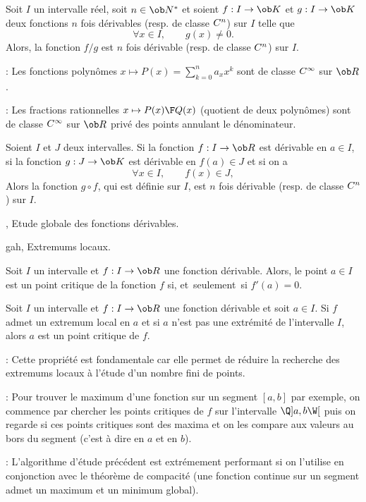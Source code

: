 \Propriete []  Soit $I$ un intervalle r\'eel, soit $n\in\ob N^*$ et soient $f:I\to\ob K$ et $g:I\to\ob K$ 
\pn
deux fonctions $n$ fois d\'erivables (resp. de classe $\sc C^n$) sur $I$ telle que 
$$
\forall x\in I, \qquad g(x)\neq 0.
$$ 
Alors, la fonction $f/g$ est $n$ fois d\'erivable (resp. de classe $\sc C^n$) sur $I$. 

\Remarque : Les fonctions polyn\^omes $x\mapsto P(x)=\sum_{k=0}^n a_xx^k$ sont de classe $\sc C^\infty$ 
sur $\ob R$. 
\bigskip

\Remarque  : Les fractions rationnelles $x\mapsto {P(x)\F Q(x)}$ (quotient de deux polyn\^omes) sont de classe $\sc C^\infty$ sur $\ob R$ priv\'e des points annulant le d\'enominateur. 
\bigskip

 
\Theoreme []  Soient $I$ et $J$ deux intervalles. Si la fonction $f:I\to\ob R$ 
est d\'erivable en $a\in I$, si la fonction $g:J\to\ob K$ est d\'erivable en $f(a)\in J$ et si on a 
$$
\forall x\in I, \qquad f(x)\in J,
$$
Alors la fonction $g\circ f$, qui est d\'efinie sur $I$, est $n$ fois d\'erivable (resp. de classe $\sc C^n$) sur $I$. 

\Section , Etude globale des fonctions d\'erivables. 


\Subsection gah, Extremums locaux. 

\Definition []  Soit $I$ un intervalle et $f:I\to\ob R$ une fonction d\'erivable. Alors, le point $a\in I$ est un point critique de la fonction $f$ si, et~seulement~si $f'(a)=0$. 
\bigskip

\Propriete []  Soit $I$ un intervalle et $f:I\to\ob R$ une fonction d\'erivable et soit $a\in I$. Si $f$ admet un extremum local en $a$ et si $a$ n'est pas une extr\'emit\'e de l'intervalle $I$, alors $a$ est un point critique de $f$. 
\bigskip

\Remarque : Cette propri\'et\'e est fondamentale car elle permet de r\'eduire la recherche des extremums locaux \`a l'\'etude d'un nombre fini de points. 
\bigskip

\Remarque : Pour trouver le maximum d'une fonction sur un segment $[a,b]$ par exemple, on commence par chercher les points critiques de $f$ sur l'intervalle $\Q]a,b\W[$ puis on regarde si ces points critiques sont des maxima et on les compare aux valeurs au bors du segment (c'est \`a dire en $a$ et en $b$).
\bigskip

\Remarque  : L'algorithme d'\'etude pr\'ec\'edent est extr\'emement performant si on l'utilise en conjonction 
avec le th\'eor\`eme de compacit\'e (une fonction continue sur un segment admet un maximum et un minimum global). 
\bigskip

